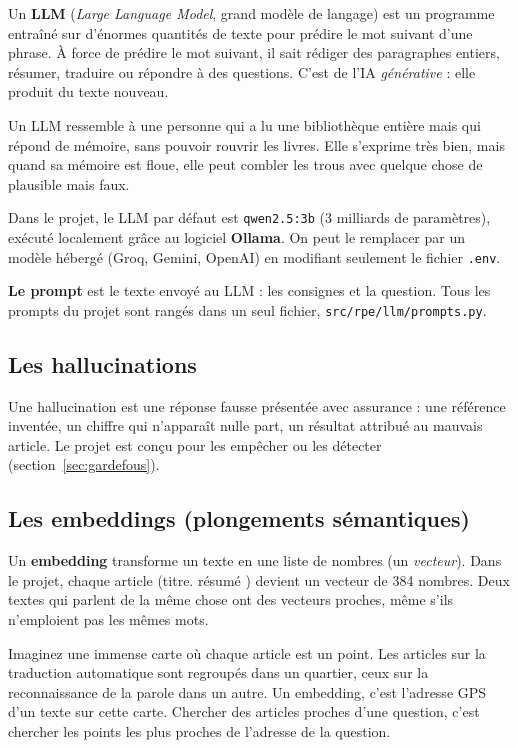 \documentclass[11pt,a4paper]{article}
\newcommand{\code}[1]{\texttt{#1}}
\begin{document}
Un \textbf{LLM} (\emph{Large Language Model}, grand modèle de langage) est un programme
entraîné sur d'énormes quantités de texte pour prédire le mot suivant d'une phrase. À force
de prédire le mot suivant, il sait rédiger des paragraphes entiers, résumer, traduire ou
répondre à des questions. C'est de l'IA \emph{générative} : elle produit du texte nouveau.

\begin{analogie}
Un LLM ressemble à une personne qui a lu une bibliothèque entière mais qui répond de
mémoire, sans pouvoir rouvrir les livres. Elle s'exprime très bien, mais quand sa mémoire
est floue, elle peut \og combler les trous \fg{} avec quelque chose de plausible mais faux.
\end{analogie}

Dans le projet, le LLM par défaut est \code{qwen2.5:3b} (3 milliards de paramètres), exécuté
localement grâce au logiciel \textbf{Ollama}. On peut le remplacer par un modèle hébergé
(Groq, Gemini, OpenAI) en modifiant seulement le fichier \code{.env}.

\textbf{Le prompt} est le texte envoyé au LLM : les consignes et la question. Tous les
prompts du projet sont rangés dans un seul fichier, \code{src/rpe/llm/prompts.py}.

\subsection{Les hallucinations}

Une hallucination est une réponse fausse présentée avec assurance : une référence inventée,
un chiffre qui n'apparaît nulle part, un résultat attribué au mauvais article. Le projet est
conçu pour les empêcher ou les détecter (section~\ref{sec:gardefous}).

\subsection{Les embeddings (plongements sémantiques)}

Un \textbf{embedding} transforme un texte en une liste de nombres (un \emph{vecteur}). Dans
le projet, chaque article (\og titre. résumé \fg{}) devient un vecteur de 384 nombres. Deux
textes qui parlent de la même chose ont des vecteurs proches, même s'ils n'emploient pas les
mêmes mots.

\begin{analogie}
Imaginez une immense carte où chaque article est un point. Les articles sur la traduction
automatique sont regroupés dans un quartier, ceux sur la reconnaissance de la parole dans un
autre. Un embedding, c'est l'adresse GPS d'un texte sur cette carte. Chercher des articles
proches d'une question, c'est chercher les points les plus proches de l'adresse de la
question.
\end{analogie}
\end{document}

